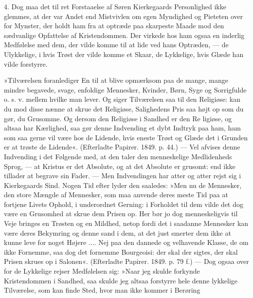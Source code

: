 \documentclass[12pt,a4paper,openany]{book}
\newcommand{\opage}[1]{\marginnote{\footnotesize\textit{[#1]}}}
\begin{document}
4. Dog maa det til ret Forstaaelse af Søren Kierkegaards
Personlighed ikke glemmes, at der var Andet end
Mistvivlen om egen Myndighed og Pieteten over for Mynster,
der holdt ham fra at optræde paa skarpeste Maade
mod den sædvanlige Opfattelse af Kristendommen. Der
virkede hos ham ogsaa en inderlig Medfølelse med dem,
der vilde komme til at lide ved hans Optræden, --- de
Ulykkelige, i hvis Trøst der vilde komme et Skaar, de
Lykkelige, hvis Glæde han vilde forstyrre.

»Tilværelsen foranlediger En til at blive opmærksom
paa de mange, mange mindre begavede, svage, enfoldige
Mennesker, Kvinder, Børn, Syge og Sorrigfulde o. s. v.
mellem hvilke man lever. Og siger Tilværelsen saa til
den Religiøse: kan du mod disse nænne at skrue det
Religiøse, Salighedens Pris saa højt op som du gør, du Grusomme.
Og dersom den Religiøse i Sandhed er den Re%
\opage{137}ligiøse, og altsaa har Kærlighed, saa gør denne Indvending
et dybt Indtryk paa ham, ham som saa gerne
vil være hos de Lidende, hvis eneste Trøst og Glæde
det i Grunden er at trøste de Lidende«. (Efterladte Papirer.
1849. p. 44.) --- Vel afvises denne Indvending i det
Følgende med, at den taler den menneskelige Medlidenheds
Sprog, --- at Kristus er det Absolute, og at det
Absolute er grusomt: end ikke tillader at begrave sin
Fader. --- Men Indvendingen har atter og atter rejst sig
i Kierkegaards Sind. Nogen Tid efter lyder den saaledes:
»Men nu de Mennesker, den store Mængde af
Mennesker, som maa anvende deres meste Tid paa at
fortjene Livets Ophold, i underordnet Gerning: i Forholdet
til dem vilde det dog være en Grusomhed at skrue
dem Prisen op. Her bør jo dog menneskeligvis til Veje
bringes en Trøsten og en Mildhed, netop fordi det i saadanne
Mennesker kan være deres Bekymring og denne
sand i dem, at det just smerter dem ikke at kunne leve
for noget Højere .... Nej paa den dannede og velhavende
Klasse, de om ikke Fornemme, saa dog det fornemme
Bourgeoisi: der skal der sigtes, der skal Prisen skrues
op i Salonen«. (Efterladte Papirer. 1849. p. 79 f.) ---
Dog ogsaa over for de Lykkelige rejser Medfølelsen sig:
»Naar jeg skulde forkynde Kristendommen i Sandhed, saa
skulde jeg altsaa forstyrre hele denne lykkelige Tilværelse,
som kan finde Sted, hvor man ikke kommer i Berøring
\end{document}
